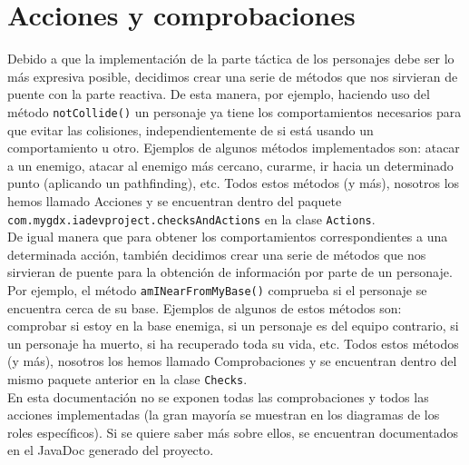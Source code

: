 \medskip
\section{Acciones y comprobaciones}
Debido a que la implementación de la parte táctica de los personajes debe ser lo más expresiva posible, decidimos crear una serie de métodos que nos sirvieran de puente con la parte reactiva. De esta manera, por ejemplo, haciendo uso del método \texttt{notCollide()} un personaje ya tiene los comportamientos necesarios para que evitar las colisiones, independientemente de si está usando un comportamiento u otro. Ejemplos de algunos métodos implementados son: atacar a un enemigo, atacar al enemigo más cercano, curarme, ir hacia un determinado punto (aplicando un pathfinding), etc. Todos estos métodos (y más), nosotros los hemos llamado Acciones y se encuentran dentro del paquete \texttt{com.mygdx.iadevproject.checksAndActions} en la clase \texttt{Actions}. \\

De igual manera que para obtener los comportamientos correspondientes a una determinada acción, también decidimos crear una serie de métodos que nos sirvieran de puente para la obtención de información por parte de un personaje. Por ejemplo, el método \texttt{amINearFromMyBase()}
comprueba si el personaje se encuentra cerca de su base. Ejemplos de algunos de estos métodos son: comprobar si estoy en la base enemiga, si un personaje es del equipo contrario, si un personaje ha muerto, si ha recuperado toda su vida, etc. Todos estos métodos (y más), nosotros los hemos llamado Comprobaciones y se encuentran dentro del mismo paquete anterior en la clase \texttt{Checks}. \\

En esta documentación no se exponen todas las comprobaciones y todos las acciones implementadas (la gran mayoría se muestran en los diagramas de los roles específicos). Si se quiere saber más sobre ellos, se encuentran documentados en el JavaDoc generado del proyecto.
